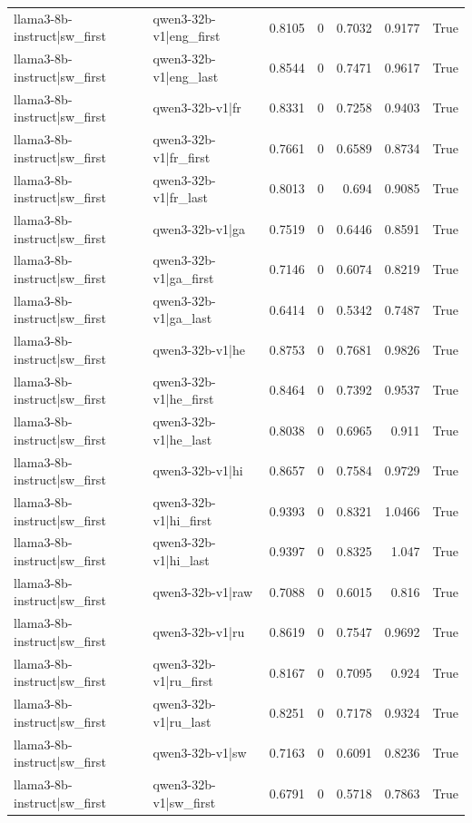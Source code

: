 \begin{table}
\begin{tabular}{l l r r r r l}
llama3-8b-instruct|sw_first & qwen3-32b-v1|eng_first & 0.8105 & 0 & 0.7032 & 0.9177 & True \\
llama3-8b-instruct|sw_first & qwen3-32b-v1|eng_last & 0.8544 & 0 & 0.7471 & 0.9617 & True \\
llama3-8b-instruct|sw_first & qwen3-32b-v1|fr & 0.8331 & 0 & 0.7258 & 0.9403 & True \\
llama3-8b-instruct|sw_first & qwen3-32b-v1|fr_first & 0.7661 & 0 & 0.6589 & 0.8734 & True \\
llama3-8b-instruct|sw_first & qwen3-32b-v1|fr_last & 0.8013 & 0 & 0.694 & 0.9085 & True \\
llama3-8b-instruct|sw_first & qwen3-32b-v1|ga & 0.7519 & 0 & 0.6446 & 0.8591 & True \\
llama3-8b-instruct|sw_first & qwen3-32b-v1|ga_first & 0.7146 & 0 & 0.6074 & 0.8219 & True \\
llama3-8b-instruct|sw_first & qwen3-32b-v1|ga_last & 0.6414 & 0 & 0.5342 & 0.7487 & True \\
llama3-8b-instruct|sw_first & qwen3-32b-v1|he & 0.8753 & 0 & 0.7681 & 0.9826 & True \\
llama3-8b-instruct|sw_first & qwen3-32b-v1|he_first & 0.8464 & 0 & 0.7392 & 0.9537 & True \\
llama3-8b-instruct|sw_first & qwen3-32b-v1|he_last & 0.8038 & 0 & 0.6965 & 0.911 & True \\
llama3-8b-instruct|sw_first & qwen3-32b-v1|hi & 0.8657 & 0 & 0.7584 & 0.9729 & True \\
llama3-8b-instruct|sw_first & qwen3-32b-v1|hi_first & 0.9393 & 0 & 0.8321 & 1.0466 & True \\
llama3-8b-instruct|sw_first & qwen3-32b-v1|hi_last & 0.9397 & 0 & 0.8325 & 1.047 & True \\
llama3-8b-instruct|sw_first & qwen3-32b-v1|raw & 0.7088 & 0 & 0.6015 & 0.816 & True \\
llama3-8b-instruct|sw_first & qwen3-32b-v1|ru & 0.8619 & 0 & 0.7547 & 0.9692 & True \\
llama3-8b-instruct|sw_first & qwen3-32b-v1|ru_first & 0.8167 & 0 & 0.7095 & 0.924 & True \\
llama3-8b-instruct|sw_first & qwen3-32b-v1|ru_last & 0.8251 & 0 & 0.7178 & 0.9324 & True \\
llama3-8b-instruct|sw_first & qwen3-32b-v1|sw & 0.7163 & 0 & 0.6091 & 0.8236 & True \\
llama3-8b-instruct|sw_first & qwen3-32b-v1|sw_first & 0.6791 & 0 & 0.5718 & 0.7863 & True \\

\end{tabular}
\end{table}
